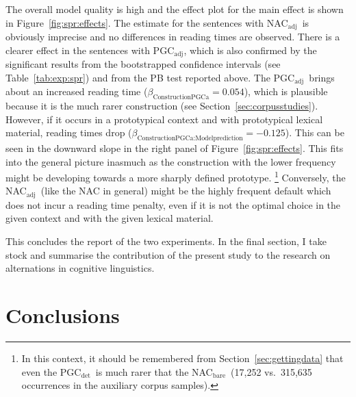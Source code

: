 \documentclass[USenglish]{article}
\newcommand{\Sub}[1]{\ensuremath{\mathrm{_{#1}}}}
\newcommand{\NACb}{NAC\Sub{bare}}
\newcommand{\NACa}{NAC\Sub{adj}}
\newcommand{\PGCd}{PGC\Sub{det}}
\newcommand{\PGCa}{PGC\Sub{adj}}
\begin{document}
The overall model quality is high and the effect plot for the main effect is shown in Figure~\ref{fig:spr:effects}.
The estimate for the sentences with \NACa\ is obviously imprecise and no differences in reading times are observed.
There is a clearer effect in the sentences with \PGCa, which is also confirmed by the significant results from the bootstrapped confidence intervals (see Table~\ref{tab:exp:spr}) and from the PB test reported above.
The \PGCa\ brings about an increased reading time ($\beta_{\text{ConstructionPGCa}}=0.054$), which is plausible because it is the much rarer construction (see Section~\ref{sec:corpusstudies}).
However, if it occurs in a prototypical context and with prototypical lexical material, reading times drop ($\beta_{\text{ConstructionPGCa:Modelprediction}}=-0.125$).
This can be seen in the downward slope in the right panel of Figure~\ref{fig:spr:effects}.
This fits into the general picture inasmuch as the construction with the lower frequency might be developing towards a more sharply defined prototype.%
\footnote{In this context, it should be remembered from Section~\ref{sec:gettingdata} that even the \PGCd\ is much rarer that the \NACb\ (17,252 vs.\ 315,635 occurrences in the auxiliary corpus samples).}
Conversely, the \NACa\ (like the NAC in general) might be the highly frequent default which does not incur a reading time penalty, even if it is not the optimal choice in the given context and with the given lexical material.

This concludes the report of the two experiments.
In the final section, I take stock and summarise the contribution of the present study to the research on alternations in cognitive linguistics.




\section{Conclusions}
\label{sec:conclusion}
\end{document}
